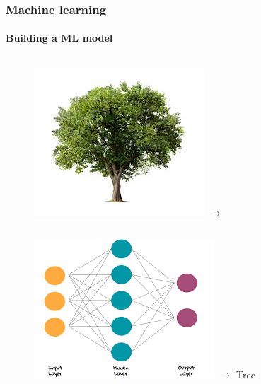 \documentclass[aspectratio=43]{beamer}
\begin{document}
\begin{frame}
\begin{figure}
	\end{figure}

\end{frame}

\begin{frame}

	\frametitle{Machine learning}
	\framesubtitle{Building a ML model}
	
	\begin{figure}
		
		\begin{columns}
			\includegraphics[width = \linewidth]{tree1.jpeg}
			$\longrightarrow$
		\end{columns}
		\endminipage
		\hspace*{-1.25cm}	
		\includegraphics[width = 1.25\linewidth]{NN.png}
		\endminipage
		\hspace*{0.75cm}
		$\longrightarrow$
		{\color{darkgreen}Tree \checkmark}
		\endminipage
		
	\end{figure}

\end{frame}
\end{document}
